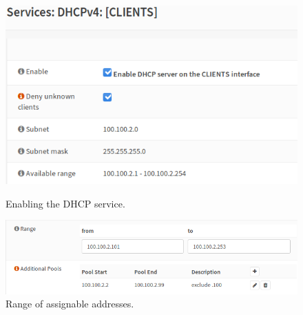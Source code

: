 \begin{figure}[H]
\centering
\begin{minipage}{.5\textwidth}
  \centering
  \includegraphics[width=1\textwidth]{dhcp_clients.png}
  \caption[a]{Enabling the DHCP service.}\label{fig:2}
\end{minipage}%
\begin{minipage}{.5\textwidth}
  \centering
  \includegraphics[width=1\textwidth]{dhcp_range.png}
  \caption[a]{Range of assignable addresses.}\label{fig:3}
\end{minipage}
\end{figure}

